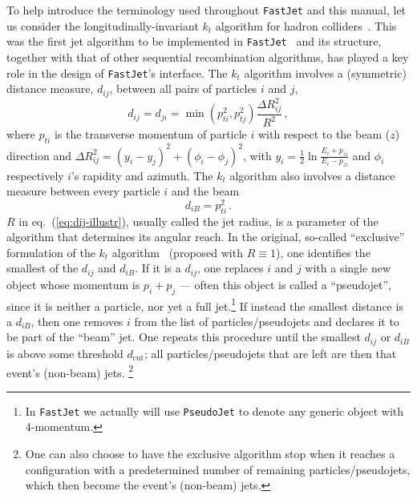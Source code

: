 \documentclass[12pt,a4]{article}
\newcommand{\fastjet}{\texttt{FastJet}\xspace}
\begin{document}
To help introduce the terminology used throughout \fastjet and this
manual, let us consider the longitudinally-invariant $k_t$ algorithm
for hadron colliders~\cite{ktexcl,ktincl}.
%
This was the first jet algorithm to be implemented in
\fastjet~\cite{fastjet} and its 
structure, together with that of other sequential recombination
algorithms, has played a key role in the design of \fastjet's interface.
%
The $k_t$ algorithm involves a (symmetric) distance measure, $d_{ij}$,
between all pairs of particles $i$ and $j$,
\begin{equation}
  \label{eq:dij-illustr}
  d_{ij} = d_{ji} = \min(p_{ti}^2, p_{tj}^2) \frac{\Delta R_{ij}^2}{R^2}\,,
\end{equation}
where $p_{ti}$ is the transverse momentum of particle $i$ with respect
to the beam ($z$) direction and $\Delta R_{ij}^2 = (y_i - y_j)^2 +
(\phi_i - \phi_j)^2$, with $y_i = \frac12 \ln \frac{E_i + p_{zi}}{E_i
  - p_{zi}}$ and $\phi_i$ respectively $i$'s rapidity and azimuth.
%
The $k_t$ algorithm also involves a distance measure between every
particle $i$ and the beam
\begin{equation}
  \label{eq:diB-illustr}
  d_{iB} = p_{ti}^2\,.
\end{equation}
%
$R$ in eq.~(\ref{eq:dij-illustr}), usually called the jet radius, is a
parameter of the algorithm that determines its angular reach.
%
In the original, so-called ``exclusive'' formulation of the $k_t$
algorithm~\cite{ktexcl} (proposed with $R\equiv 1$), one identifies
the smallest of the $d_{ij}$ and $d_{iB}$. 
%
If it is a $d_{ij}$, one replaces $i$ and $j$ with a single new object
whose momentum is $p_i + p_j$ --- often this object is called a
``pseudojet'', since it is neither a particle, nor yet a full
jet.\footnote{In \fastjet we actually will use \texttt{PseudoJet} to denote any
  generic object with 4-momentum.}
%
If instead the smallest distance is a $d_{iB}$, then one removes $i$
from the list of particles/pseudojets and declares it to be part of
the ``beam'' jet.
%
One repeats this procedure until the smallest $d_{ij}$ or $d_{iB}$ is
above some threshold $d_{\text{cut}}$; all particles/pseudojets that
are left are then that event's (non-beam) jets.%
%
\footnote{One can also choose to have the exclusive algorithm stop
  when it reaches a configuration with a predetermined number of
  remaining particles/pseudojets, which then become the event's
  (non-beam) jets.}
\end{document}
